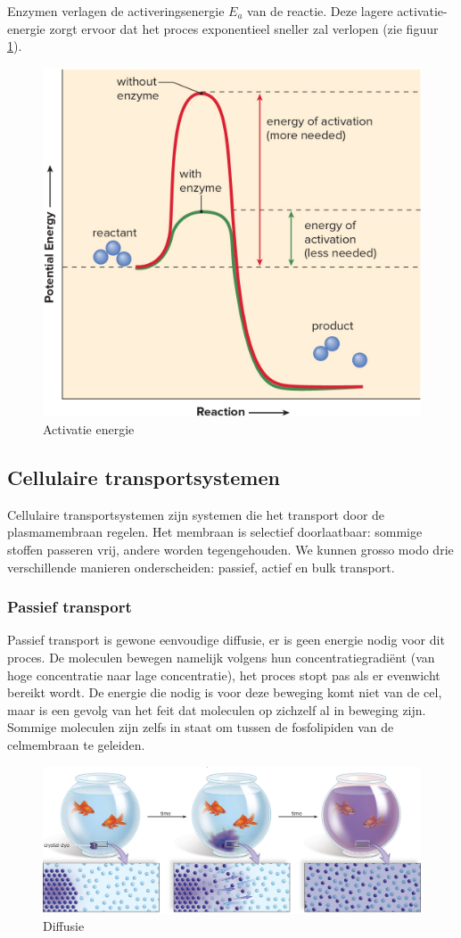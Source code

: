 \documentclass[a4paper,kul]{kulakarticle} %
\begin{document}
Enzymen verlagen de activeringsenergie $E_a$ van de reactie. Deze lagere activatie-energie zorgt ervoor dat het proces exponentieel sneller zal verlopen (zie figuur \ref{fig:activatieenergie}). 
\begin{figure}[h]
	\centering
	\includegraphics[width=0.7\linewidth]{ActivatieEnergie}
	\caption[Activatie energie]{Activatie energie}
	\label{fig:activatieenergie}
\end{figure}



\subsection{Cellulaire transportsystemen}
Cellulaire transportsystemen zijn systemen die het transport door de plasmamembraan regelen. Het membraan is selectief doorlaatbaar: sommige stoffen passeren vrij, andere worden tegengehouden. We kunnen grosso modo drie verschillende manieren onderscheiden: passief, actief en bulk transport. 
\subsubsection{Passief transport}
Passief transport is gewone eenvoudige diffusie, er is geen energie nodig voor dit proces. De moleculen bewegen namelijk volgens hun concentratiegradiënt (van hoge concentratie naar lage concentratie), het proces stopt pas als er evenwicht bereikt wordt. De energie die nodig is voor deze beweging komt niet van de cel, maar is een gevolg van het feit dat moleculen op zichzelf al in beweging zijn. Sommige moleculen zijn zelfs in staat om tussen de fosfolipiden van de celmembraan te geleiden.
\begin{figure}[h]
	\centering
	\includegraphics[width=0.7\linewidth]{Diffusie}
	\caption[Diffusie]{Diffusie}
	\label{fig:diffusie}
\end{figure}
\end{document}
